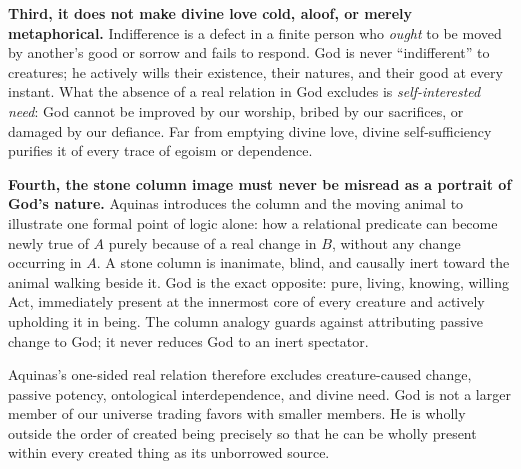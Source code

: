 \textbf{Third, it does not make divine love cold, aloof, or merely metaphorical.} Indifference is a defect in a finite person who \emph{ought} to be moved by another's good or sorrow and fails to respond. God is never ``indifferent'' to creatures; he actively wills their existence, their natures, and their good at every instant. What the absence of a real relation in God excludes is \emph{self-interested need}: God cannot be improved by our worship, bribed by our sacrifices, or damaged by our defiance. Far from emptying divine love, divine self-sufficiency purifies it of every trace of egoism or dependence.

\textbf{Fourth, the stone column image must never be misread as a portrait of God's nature.} Aquinas introduces the column and the moving animal to illustrate one formal point of logic alone: how a relational predicate can become newly true of $A$ purely because of a real change in $B$, without any change occurring in $A$. A stone column is inanimate, blind, and causally inert toward the animal walking beside it. God is the exact opposite: pure, living, knowing, willing Act, immediately present at the innermost core of every creature and actively upholding it in being. The column analogy guards against attributing passive change to God; it never reduces God to an inert spectator.

Aquinas's one-sided real relation therefore excludes creature-caused change, passive potency, ontological interdependence, and divine need. God is not a larger member of our universe trading favors with smaller members. He is wholly outside the order of created being precisely so that he can be wholly present within every created thing as its unborrowed source.
